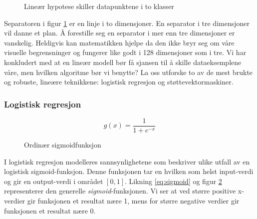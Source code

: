 \begin{figure}[h!]
\centering
{}
\caption{Lineær hypotese skiller datapunktene i to klasser}
\label{figure:separator}
\end{figure}
Separatoren i figur \ref{figure:separator} er en linje i to dimensjoner. En separator i tre dimensjoner vil danne et plan. Å forestille seg en separator i mer enn tre dimensjoner er vanskelig. Heldigvis kan matematikken hjelpe da den ikke bryr seg om våre visuelle begrensninger og fungerer like godt i 128 dimensjoner som i tre. Vi har konkludert med at en lineær modell bør få sjansen til å skille dataeksemplene våre, men hvilken algoritme bør vi benytte? La oss utforske to av de mest brukte og robuste, lineære teknikkene: logistisk regresjon og støttevektormaskiner.

\subsubsection*{Logistisk regresjon}
\begin{equation}
g(x) = \frac{1}{1 + e^{-x}}
\label{eq:sigmoid}
\end{equation}
\begin{figure}[h!]
\centering
{}
\caption{Ordinær sigmoidfunksjon}
\label{figure:sigmoid}
\end{figure}
I logistisk regresjon modelleres sannsynlighetene som beskriver ulike utfall av en logistisk sigmoid-funksjon. Denne funksjonen tar en hvilken som helst input-verdi og gir en output-verdi i området \([0,1]\). Likning \ref{eq:sigmoid} og figur \ref{figure:sigmoid} representerer den generelle \emph{sigmoid}-funksjonen. Vi ser at ved større positive x-verdier gir funksjonen et resultat nære 1, mens for større negative verdier gir funksjonen et resultat nære 0.

